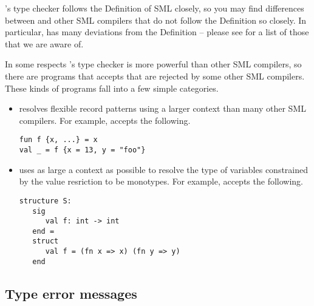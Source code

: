 %
{\mlton}'s type checker follows the Definition of SML closely, so you
may find differences between {\mlton} and other SML compilers that do
not follow the Definition so closely.  In particular, {\smlnj} has
many deviations from the Definition -- please see
 for a list of those that we are aware of.

In some respects {\mlton}'s type checker is more powerful than other
SML compilers, so there are programs that {\mlton} accepts that are
rejected by some other SML compilers.  These kinds of programs fall
into a few simple categories.

\begin{itemize}

\item
{\mlton} resolves flexible record patterns using a larger context than
many other SML compilers.  For example, {\mlton} accepts the
following.
\begin{verbatim}
fun f {x, ...} = x
val _ = f {x = 13, y = "foo"}
\end{verbatim}
%
\item
{\mlton} uses as large a context as possible to resolve the type of
variables constrained by the value resriction to be monotypes.  For
example, {\mlton} accepts the following.
\begin{verbatim}
structure S:
   sig
      val f: int -> int
   end =
   struct
      val f = (fn x => x) (fn y => y)
   end
\end{verbatim}

\end{itemize}

\subsection{Type error messages}

